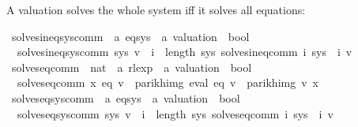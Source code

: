 \begin{isabellebody}
\begin{isamarkuptext}%
A valuation  solves the whole system iff it solves all equations:%
\end{isamarkuptext}\isamarkuptrue%
\isamarkupfalse%
\ solves{\isacharunderscore}{\kern0pt}ineq{\isacharunderscore}{\kern0pt}sys{\isacharunderscore}{\kern0pt}comm\ {\isacharcolon}{\kern0pt}{\isacharcolon}{\kern0pt}\ {\isachardoublequoteopen}{\isacharprime}{\kern0pt}a\ eq{\isacharunderscore}{\kern0pt}sys\ {\isasymRightarrow}\ {\isacharprime}{\kern0pt}a\ valuation\ {\isasymRightarrow}\ bool{\isachardoublequoteclose}\ \isanewline
\ \ {\isachardoublequoteopen}solves{\isacharunderscore}{\kern0pt}ineq{\isacharunderscore}{\kern0pt}sys{\isacharunderscore}{\kern0pt}comm\ sys\ v\ {\isasymequiv}\ {\isasymforall}i\ {\isacharless}{\kern0pt}\ length\ sys{\isachardot}{\kern0pt}\ solves{\isacharunderscore}{\kern0pt}ineq{\isacharunderscore}{\kern0pt}comm\ i\ {\isacharparenleft}{\kern0pt}sys\ {\isacharbang}{\kern0pt}\ i{\isacharparenright}{\kern0pt}\ v{\isachardoublequoteclose}\isanewline
\isanewline
\isanewline
{}\isamarkupfalse%
\ solves{\isacharunderscore}{\kern0pt}eq{\isacharunderscore}{\kern0pt}comm\ {\isacharcolon}{\kern0pt}{\isacharcolon}{\kern0pt}\ {\isachardoublequoteopen}nat\ {\isasymRightarrow}\ {\isacharprime}{\kern0pt}a\ rlexp\ {\isasymRightarrow}\ {\isacharprime}{\kern0pt}a\ valuation\ {\isasymRightarrow}\ bool{\isachardoublequoteclose}\ \isanewline
\ \ {\isachardoublequoteopen}solves{\isacharunderscore}{\kern0pt}eq{\isacharunderscore}{\kern0pt}comm\ x\ eq\ v\ {\isasymequiv}\ parikh{\isacharunderscore}{\kern0pt}img\ {\isacharparenleft}{\kern0pt}eval\ eq\ v{\isacharparenright}{\kern0pt}\ {\isacharequal}{\kern0pt}\ parikh{\isacharunderscore}{\kern0pt}img\ {\isacharparenleft}{\kern0pt}v\ x{\isacharparenright}{\kern0pt}{\isachardoublequoteclose}\isanewline
\isanewline
\isanewline
{}\isamarkupfalse%
\ solves{\isacharunderscore}{\kern0pt}eq{\isacharunderscore}{\kern0pt}sys{\isacharunderscore}{\kern0pt}comm\ {\isacharcolon}{\kern0pt}{\isacharcolon}{\kern0pt}\ {\isachardoublequoteopen}{\isacharprime}{\kern0pt}a\ eq{\isacharunderscore}{\kern0pt}sys\ {\isasymRightarrow}\ {\isacharprime}{\kern0pt}a\ valuation\ {\isasymRightarrow}\ bool{\isachardoublequoteclose}\ \isanewline
\ \ {\isachardoublequoteopen}solves{\isacharunderscore}{\kern0pt}eq{\isacharunderscore}{\kern0pt}sys{\isacharunderscore}{\kern0pt}comm\ sys\ v\ {\isasymequiv}\ {\isasymforall}i\ {\isacharless}{\kern0pt}\ length\ sys{\isachardot}{\kern0pt}\ solves{\isacharunderscore}{\kern0pt}eq{\isacharunderscore}{\kern0pt}comm\ i\ {\isacharparenleft}{\kern0pt}sys\ {\isacharbang}{\kern0pt}\ i{\isacharparenright}{\kern0pt}\ v{\isachardoublequoteclose}%

\end{isabellebody}
